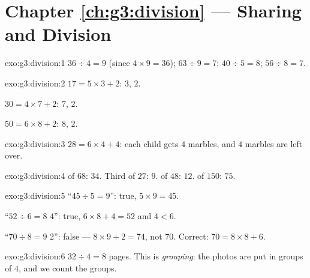 \section*{Chapter \ref{ch:g3:division} --- Sharing and Division}

\begin{solution}{exo:g3:division:1}
$36 \div 4 = 9$ (since $4 \times 9 = 36$); \quad
$63 \div 9 = 7$; \quad $40 \div 5 = 8$; \quad $56 \div 8 = 7$.
\end{solution}

\begin{solution}{exo:g3:division:2}
$17 = 5 \times 3 + 2$:  $3$,  $2$.

$30 = 4 \times 7 + 2$:  $7$,  $2$.

$50 = 6 \times 8 + 2$:  $8$,  $2$.
\end{solution}

\begin{solution}{exo:g3:division:3}
$28 = 6 \times 4 + 4$: each child gets $4$ marbles, and $4$ marbles
are left over.
\end{solution}

\begin{solution}{exo:g3:division:4}
 of $68$: $34$. Third of $27$: $9$.  of $48$: $12$. 
of $150$: $75$.
\end{solution}

\begin{solution}{exo:g3:division:5}
``$45 \div 5 = 9$'': true, $5 \times 9 = 45$.

``$52 \div 6 = 8$  $4$'': true, $6 \times 8 + 4 = 52$ and
$4 < 6$.

``$70 \div 8 = 9$  $2$'': false --- $8 \times 9 + 2 = 74$,
not $70$. Correct: $70 = 8 \times 8 + 6$.
\end{solution}

\begin{solution}{exo:g3:division:6}
$32 \div 4 = 8$ pages. This is \emph{grouping}: the photos are put
in groups of $4$, and we count the groups.
\end{solution}

